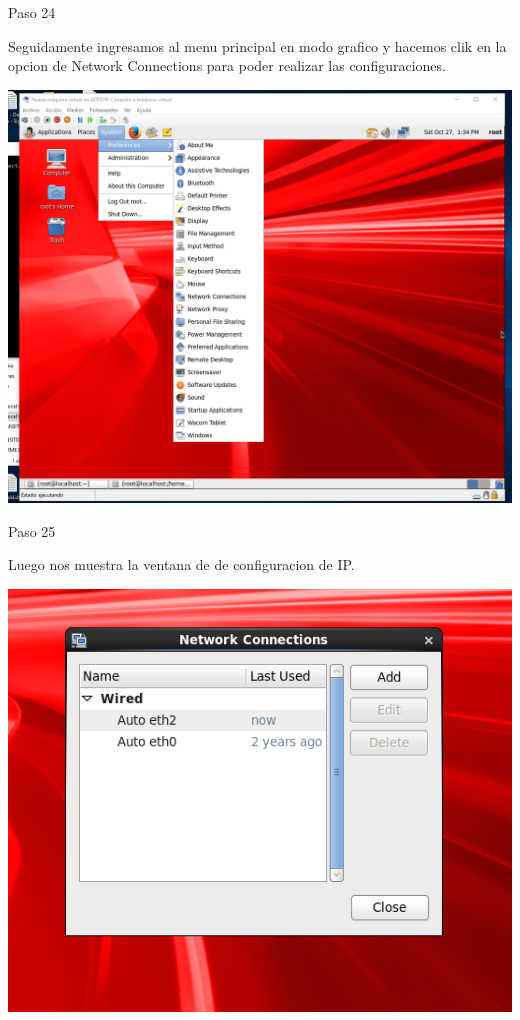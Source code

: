 \begin{itemize}
\begin{center}
    Paso 24
\end{center}

    Seguidamente ingresamos al menu principal en modo grafico y hacemos clik en la opcion de Network Connections para poder realizar las configuraciones.
	\begin{center}
	\includegraphics[width=15cm]{./Imagenes/imagen24} 
	\end{center}

\end{itemize} 

\begin{itemize}
\begin{center}
    Paso 25
\end{center}

    Luego nos muestra la ventana de de configuracion de IP. 
	\begin{center}
	\includegraphics[width=15cm]{./Imagenes/imagen25} 
	\end{center}

\end{itemize} 


